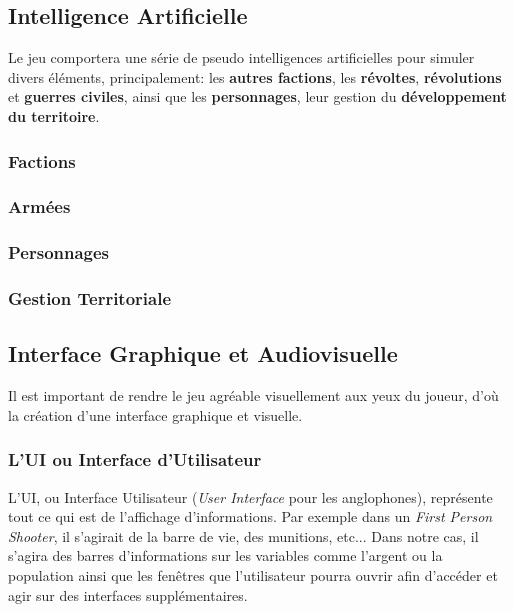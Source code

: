 \documentclass{article}
\begin{document}
    \subsection{Intelligence Artificielle}
        Le jeu comportera une série de pseudo intelligences artificielles pour simuler divers éléments, principalement: les \textbf{autres factions}, les \textbf{révoltes}, \textbf{révolutions} et \textbf{guerres civiles}, ainsi que les \textbf{personnages}, leur gestion du \textbf{développement du territoire}.

        \subsubsection{Factions}

        \subsubsection{Armées}

        \subsubsection{Personnages}

        \subsubsection{Gestion Territoriale}

    \subsection{Interface Graphique et Audiovisuelle}
        Il est important de rendre le jeu agréable visuellement aux yeux du joueur, d'où la création d'une interface graphique et visuelle.
        
        \subsubsection{L'UI ou Interface d'Utilisateur}
            L'UI, ou Interface Utilisateur (\textit{User Interface} pour les anglophones), représente tout ce qui est de l'affichage d'informations. Par exemple dans un \textit{First Person Shooter}, il s'agirait de la barre de vie, des munitions, etc... Dans notre cas, il s'agira des barres d'informations sur les variables comme l'argent ou la population ainsi que les fenêtres que l'utilisateur pourra ouvrir afin d'accéder et agir sur des interfaces supplémentaires. \\
\end{document}
